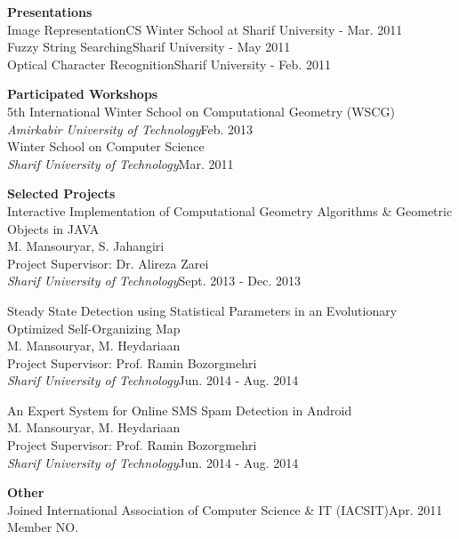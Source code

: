 \documentclass[margin,line]{resume}
\begin{document}
\begin{resume}
    {\bf Presentations}\vspace{1mm}\\
     Image Representation\hfill {\sf CS Winter School at Sharif University - Mar. 2011}  \\
     Fuzzy String Searching\hfill {\sf Sharif University - May 2011}  \\
     Optical Character Recognition\hfill {\sf Sharif University - Feb. 2011}
      
     {\bf Participated Workshops}\vspace{1mm}\\
      5th International Winter School on Computational Geometry (WSCG)\\
      {\sl Amirkabir University of Technology}\hfill {\sf Feb. 2013\vspace{1mm}}\\
      Winter School on Computer Science\\
      {\sl Sharif University of Technology}\hfill {\sf Mar. 2011}
      
      {\bf Selected Projects}\vspace{1mm}\\
      Interactive Implementation of Computational Geometry Algorithms \& Geometric Objects in JAVA\\
      M. Mansouryar, S. Jahangiri\\
      Project Supervisor: Dr. Alireza Zarei\\
      {\sl Sharif University of Technology}\hfill {\sf Sept. 2013 - Dec. 2013}
      
      Steady State Detection using Statistical Parameters in an Evolutionary Optimized Self-Organizing Map\\
      M. Mansouryar, M. Heydariaan\\
      Project Supervisor: Prof. Ramin Bozorgmehri\\
      {\sl Sharif University of Technology}\hfill {\sf Jun. 2014 - Aug. 2014}
      
      An Expert System for Online SMS Spam Detection in Android\\
      M. Mansouryar, M. Heydariaan\\
      Project Supervisor: Prof. Ramin Bozorgmehri\\
      {\sl Sharif University of Technology}\hfill {\sf Jun. 2014 - Aug. 2014}

	{\bf Other}\vspace{1mm}\\
     Joined International Association of Computer Science \& IT (IACSIT)\hfill {\sf Apr. 2011}\\%
      Member NO. {}
    

\end{resume}
\end{document}
